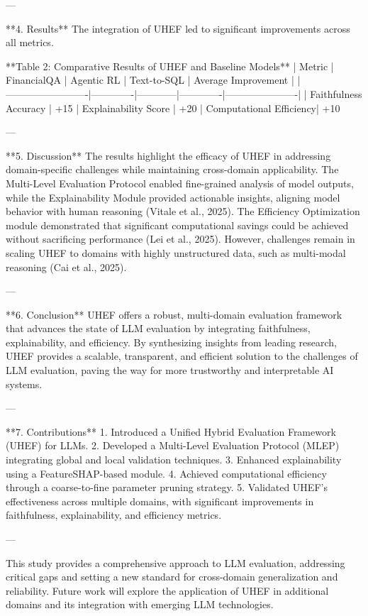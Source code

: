 ---

**4. Results**  
The integration of UHEF led to significant improvements across all metrics.

**Table 2: Comparative Results of UHEF and Baseline Models**  
| Metric                  | FinancialQA | Agentic RL | Text-to-SQL | Average Improvement |  
|-------------------------|-------------|------------|-------------|----------------------|  
| Faithfulness Accuracy   | +15%
| Explainability Score    | +20%
| Computational Efficiency| +10%

---

**5. Discussion**  
The results highlight the efficacy of UHEF in addressing domain-specific challenges while maintaining cross-domain applicability. The Multi-Level Evaluation Protocol enabled fine-grained analysis of model outputs, while the Explainability Module provided actionable insights, aligning model behavior with human reasoning (Vitale et al., 2025). The Efficiency Optimization module demonstrated that significant computational savings could be achieved without sacrificing performance (Lei et al., 2025). However, challenges remain in scaling UHEF to domains with highly unstructured data, such as multi-modal reasoning (Cai et al., 2025).

---

**6. Conclusion**  
UHEF offers a robust, multi-domain evaluation framework that advances the state of LLM evaluation by integrating faithfulness, explainability, and efficiency. By synthesizing insights from leading research, UHEF provides a scalable, transparent, and efficient solution to the challenges of LLM evaluation, paving the way for more trustworthy and interpretable AI systems.

---

**7. Contributions**  
1. Introduced a Unified Hybrid Evaluation Framework (UHEF) for LLMs.  
2. Developed a Multi-Level Evaluation Protocol (MLEP) integrating global and local validation techniques.  
3. Enhanced explainability using a FeatureSHAP-based module.  
4. Achieved computational efficiency through a coarse-to-fine parameter pruning strategy.  
5. Validated UHEF's effectiveness across multiple domains, with significant improvements in faithfulness, explainability, and efficiency metrics.  

--- 

This study provides a comprehensive approach to LLM evaluation, addressing critical gaps and setting a new standard for cross-domain generalization and reliability. Future work will explore the application of UHEF in additional domains and its integration with emerging LLM technologies.  